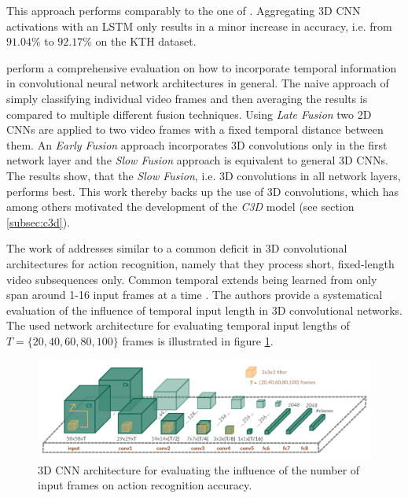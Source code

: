This approach performs comparably to the one of \textcite{ji_3d_2013}.
Aggregating 3D CNN activations with an LSTM only results in a minor increase in accuracy, i.e. from $91.04\%$ to $92.17\%$ on the KTH dataset\cite{schuldt_recognizing_2004}.

\textcite{karpathy_large-scale_2014} perform a comprehensive evaluation on how to incorporate temporal information in convolutional neural network architectures in general.
The naive approach of simply classifying individual video frames and then averaging the results is compared to multiple different fusion techniques.
Using \textit{Late Fusion} two 2D CNNs are applied to two video frames with a fixed temporal distance between them.
An \textit{Early Fusion} approach incorporates 3D convolutions only in the first network layer and the \textit{Slow Fusion} approach is equivalent to general 3D CNNs.
The results show, that the \textit{Slow Fusion}, i.e. 3D convolutions in all network layers, performs best.
This work thereby backs up the use of 3D convolutions, which has among others motivated the development of the \textit{C3D} model (see section \ref{subsec:c3d}).

The work of \textcite{varol_long-term_2016} addresses similar to \textcite{baccouche_sequential_2011} a common deficit in 3D convolutional architectures for action recognition, namely that they process short, fixed-length video subsequences only.
Common temporal extends being learned from only span around 1-16 input frames at a time \cite{ji_3d_2013}\cite{karpathy_large-scale_2014}\cite{tran_learning_2015}.
The authors provide a systematical evaluation of the influence of temporal input length in 3D convolutional networks.
The used network architecture for evaluating temporal input lengths of $T = \{20, 40, 60, 80, 100\}$ frames is illustrated in figure \ref{fig:longterm_architecture}.

\begin{figure}[H]
    \centering
    \includegraphics[width=\textwidth]{img_related/longterm_architecture}
    \caption{3D CNN architecture for evaluating the influence of the number of input frames on action recognition accuracy. \cite{varol_long-term_2016}}
    \label{fig:longterm_architecture}
\end{figure}

